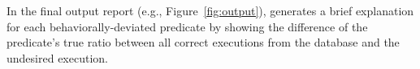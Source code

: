 In the final output report (e.g., Figure~\ref{fig:output}), \ourtool 
generates a brief explanation for each behaviorally-deviated predicate
by showing the difference of the predicate's true ratio between
all correct executions from the database and the undesired execution.




